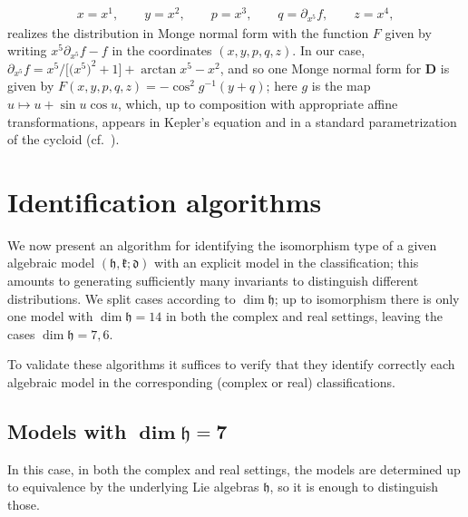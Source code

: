 \documentclass[pdftex]{sigma}
\newcommand{\mbD}{\mathbf{D}}
\newcommand{\mfd} {\mathfrak{d}}
\newcommand{\mfh} {\mathfrak{h}}
\newcommand{\mfk} {\mathfrak{k}}
\numberwithin{equation}{section}
\begin{document}
\begin{Example}
\begin{gather*}
	x = x^1, \qquad
	y = x^2, \qquad
	p = x^3, \qquad
	q = \partial_{x^5} f, \qquad
	z = x^4 ,
\end{gather*}
realizes  the distribution in Monge normal form with the function $F$ given by writing $x^5 \partial_{x^5} f - f$ in the coordinates $(x, y, p, q, z)$. In our case, $\partial_{x^5} f = x^5 / \big[\big(x^5\big)^2 + 1\big] + \arctan x^5 - x^2$, and so one Monge normal form for $\mbD$ is given by $F(x, y, p, q, z) = -\cos^2 g^{-1}(y + q)$; here $g$ is the map $u \mapsto u + \sin u \cos u$, which, up to composition with appropriate affine transformations, appears in Kepler's equation and in a standard parametrization of the cycloid (cf.\ \cite[Section~4]{CartanFiveVariables}).
\end{Example}

\section{Identification algorithms}\label{section:identification}
We now present an algorithm for identifying the isomorphism type of a given algebraic model $(\mfh, \mfk; \mfd)$ with an explicit model in the classification; this amounts to generating sufficiently many invariants to distinguish different distributions. We split cases according to $\dim \mfh$; up to isomorphism there is only one model with $\dim \mfh = 14$ in both the complex and real settings, leaving the cases $\dim \mfh = 7, 6$.

To validate these algorithms it suffices to verify that they identify correctly each algebraic model in the corresponding (complex or real) classifications.

\subsection[Models with $\dim \mfh = 7$]{Models with $\boldsymbol{\dim \mfh = 7}$}

In this case, in both the complex and real settings, the models are determined up to equivalence by the underlying Lie algebras $\mfh$, so it is enough to distinguish those.
\end{document}
